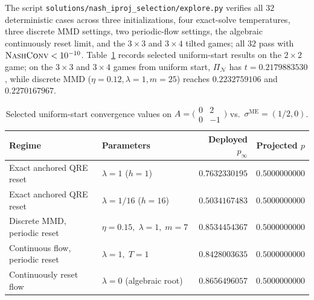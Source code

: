 \documentclass[11pt]{article}
\theoremstyle{plain}
\theoremstyle{definition}
\theoremstyle{remark}
\newcommand{\NE}{\mathcal{N}}
\begin{document}
The script \texttt{solutions/nash\_iproj\_selection/explore.py} verifies all $32$ deterministic cases across three initializations, four exact-solve temperatures, three discrete MMD settings, two periodic-flow settings, the algebraic continuously reset limit, and the $3\times 3$ and $3\times 4$ tilted games; all $32$ pass with $\textsc{NashConv} < 10^{-10}$. Table~\ref{tab:uniform} records selected uniform-start results on the $2\times 2$ game; on the $3\times 3$ and $3\times 4$ games from uniform start, $\Pi_{\NE}$ has $t = 0.2179883530$, while discrete MMD ($\eta = 0.12, \lambda = 1, m = 25$) reaches $0.2232759106$ and $0.2270167967$.

\begin{table}[htbp]
\centering
\begin{tabular}{@{}llrr@{}}
\toprule
Regime & Parameters & Deployed $p_\infty$ & Projected $p$ \\
\midrule
Exact anchored QRE reset & $\lambda = 1$ ($h = 1$) & $0.7632330195$ & $0.5000000000$ \\
Exact anchored QRE reset & $\lambda = 1/16$ ($h = 16$) & $0.5034167483$ & $0.5000000000$ \\
Discrete MMD, periodic reset & $\eta = 0.15,\; \lambda = 1,\; m = 7$ & $0.8534454367$ & $0.5000000000$ \\
Continuous flow, periodic reset & $\lambda = 1,\; T = 1$ & $0.8428003635$ & $0.5000000000$ \\
Continuously reset flow & $\lambda = 0$ (algebraic root) & $0.8656496057$ & $0.5000000000$ \\
\bottomrule
\end{tabular}
\caption{Selected uniform-start convergence values on $A = \bigl(\begin{smallmatrix} 0 & 2 \\ 0 & -1 \end{smallmatrix}\bigr)$ vs.\ $\sigma^{\mathrm{ME}} = (1/2, 0)$.}\label{tab:uniform}
\end{table}
\end{document}
